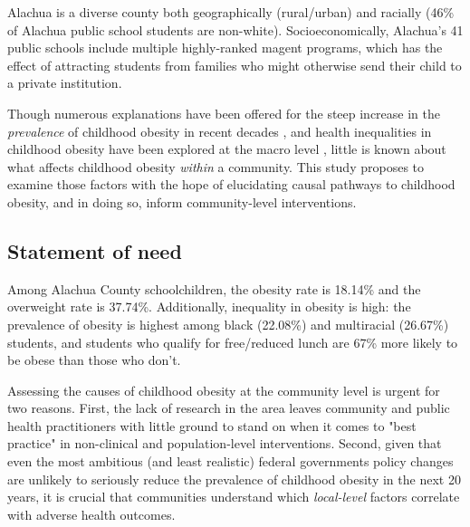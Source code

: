 \documentclass[11pt]{article}
\begin{document}
Alachua is a diverse county both geographically (rural/urban) and racially (46\% of Alachua public school students are non-white). \cite{Brew2014}  Socioeconomically, Alachua's 41 public schools include multiple highly-ranked magent programs, which has the effect of attracting students from families who might otherwise send their child to a private institution.

Though numerous explanations have been offered for the steep increase in the \emph{prevalence} of childhood obesity in recent decades \cite{Bishop2005}, and health inequalities in childhood obesity have been explored at the macro level \cite{2013} \cite{Drewnowski2009}, little is known about what affects childhood obesity \emph{within} a community. This study proposes to examine those factors with the hope of elucidating causal pathways to childhood obesity, and in doing so, inform community-level interventions. 


\subsection*{Statement of need}
Among Alachua County schoolchildren, the obesity rate is 18.14\% and the overweight rate is 37.74\%. Additionally, inequality in obesity is high: the prevalence of obesity is highest among black (22.08\%) and multiracial (26.67\%) students, and students who qualify for free/reduced lunch are 67\% more likely to be obese than those who don't.\cite{Brew2014}    

Assessing the causes of childhood obesity at the community level is urgent for two reasons.  First, the lack of research in the area leaves community and public health practitioners with little ground to stand on when it comes to "best practice" in non-clinical and population-level interventions.  Second, given that even the most ambitious (and least realistic) federal governments policy changes are unlikely to seriously reduce the prevalence of childhood obesity in the next 20 years\cite{Kristensen2014}, it is crucial that communities understand which \emph{local-level} factors correlate with adverse health outcomes.

\end{document}
